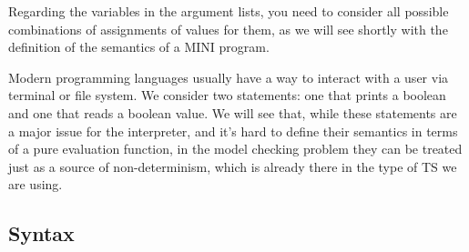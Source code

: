 \documentclass{article}
\begin{document}
Regarding the variables in the argument lists, you need to consider all possible combinations of assignments of values for them, as we will see shortly with the definition of the semantics of a MINI program.

Modern programming languages usually have a way to interact with a user via terminal or file system. We consider two statements: one that prints a boolean and one that reads a boolean value.
We will see that, while these statements are a major issue for the interpreter, and it's hard to define their semantics in terms of a pure evaluation function, in the model checking problem they can be treated just as a source of non-determinism, which is already there in the type of TS we are using.

\subsection{Syntax}
\end{document}
